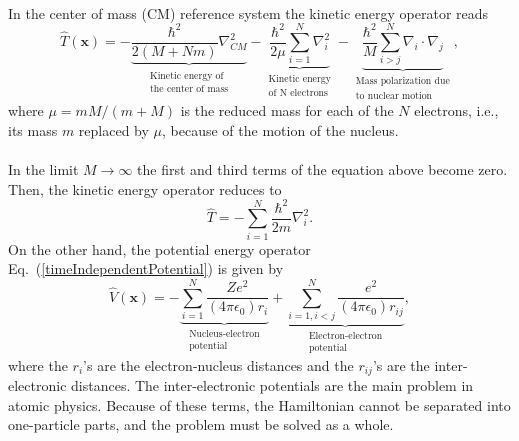 \\
\noindent
In the center of mass (CM) reference system the kinetic energy operator reads
$$
  \hat{T}(\mathbf{x}) = -\underbrace{\frac{\hbar^2}{2(M+Nm)}\nabla^2_{CM}}_{\begin{smallmatrix} \text{Kinetic energy of} \\
  \text{the center of mass}\end{smallmatrix}}
  -\underbrace{\frac{\hbar^2}{2\mu}\sum_{i=1}^{N}\nabla^{2}_{i}}_{\begin{smallmatrix} \text{Kinetic energy} \\ \text{of N electrons} \end{smallmatrix}}
  -\underbrace{\frac{\hbar^2}{M}\sum_{i>j}^{N}\nabla_i\cdot\nabla_j}_{\begin{smallmatrix} \text{Mass polarization due} \\ \text{to nuclear motion} \end{smallmatrix}},
$$
where $\mu = mM/(m+M)$ is the reduced mass for each of the $N$ electrons, i.e., its mass $m$ replaced by $\mu$, because of the motion of the nucleus. \\
\\
In the limit $M\to \infty$ the first and third terms of the equation above become zero. Then, the kinetic energy 
operator reduces to
\begin{equation}\label{totalAtomicKE}
 \boxed{\hat{T} = -\sum_{i=1}^{N}\frac{\hbar^2}{2m}\nabla^2_i.}
\end{equation}
\noindent
On the other hand, the potential energy operator  Eq.~(\ref{timeIndependentPotential}) is given by 
\begin{equation}\label{totalAtomicPE}
  \boxed{\hat{V}(\mathbf{x}) = 
  - \underbrace{\sum_{i=1}^{N} \frac{Ze^2}{(4\pi \epsilon_0)r_i}}_{\begin{smallmatrix} \text{Nucleus-electron} \\ \text{potential} \end{smallmatrix}}
  + \underbrace{\sum_{i=1,i<j}^{N} \frac{e^2}{(4\pi \epsilon_0)r_{ij}}}_{\begin{smallmatrix} \text{Electron-electron} \\ \text{potential} \end{smallmatrix}},}
\end{equation}
where the $r_i$'s are the electron-nucleus distances and the
$r_{ij}$'s are the inter-electronic distances. The inter-electronic potentials are the main problem in atomic physics. Because of these terms, the Hamiltonian cannot be separated into one-particle parts, and the problem must be solved as a whole. 



